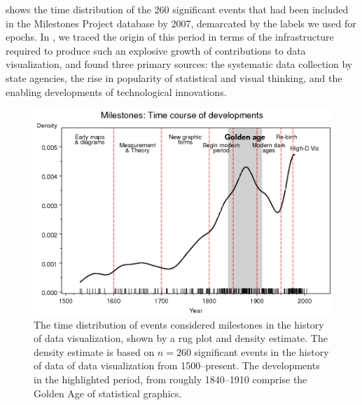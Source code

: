  shows the time distribution of the 260 significant events that had been included in the Milestones Project database by 2007, demarcated by the labels we used for epochs. In \citet{Friendly:2008:golden}, we traced the origin of this period in terms of the infrastructure required to produce such an explosive growth of contributions to data visualization, and found three primary sources: the systematic data collection by state agencies, the rise in popularity of statistical and visual thinking, and the enabling developments of technological innovations.
\begin{figure}[!htb]
  \centering
  \includegraphics[width=.9\textwidth,clip]{fig/mileyears4}
  \caption{The time distribution of events considered milestones in the history of data visualization, shown by a rug plot and density estimate. The density estimate is based on $n=260$ significant events in the history of data of data visualization from 1500--present. The developments in the highlighted period, from roughly 1840--1910 comprise the Golden Age of statistical graphics.}
  \label{fig:mileyears4}
\end{figure}